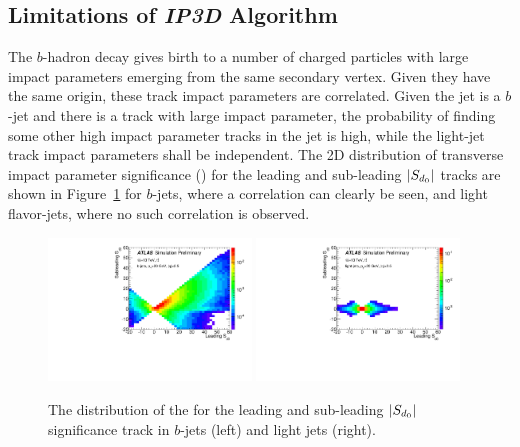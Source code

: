 \subsection{Limitations of \textit{IP3D} Algorithm}

The $b$-hadron decay gives birth to a number of charged particles with large impact parameters emerging from the same secondary vertex. Given they have the same origin, these track impact parameters are correlated. Given the jet is a $b$-jet and there is a track with large impact parameter, the probability of finding some other high impact parameter tracks in the jet is high, while the light-jet track impact parameters shall be independent. The 2D distribution of transverse impact parameter significance (\sdip) for the leading and sub-leading $|S_{d{_0}}|$ tracks are shown in Figure~\ref{fig:ip_corr} for $b$-jets, where a correlation can clearly be seen, and light flavor-jets, where no such correlation is observed.

\begin{figure}[htbp]
  \centering
   \includegraphics[width=0.48\textwidth]{figures/RNN/Sd0_2d_B.pdf}
 \includegraphics[width=0.48\textwidth]{figures/RNN/Sd0_2d_L.pdf}
\caption{The distribution of the \sdip for the leading and sub-leading $|S_{d{_0}}|$ significance track in $b$-jets (left) and light jets (right). }
  \label{fig:ip_corr}
\end{figure}


